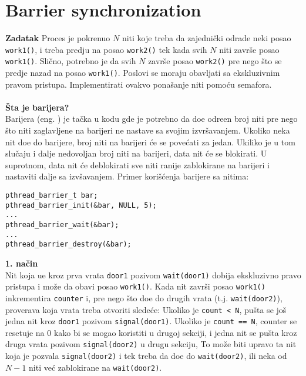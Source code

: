 \clearpage
\section{\latin Barrier synchronization}
\textbf{\large Zadatak} Proces je pokrenuo $N$ niti koje treba da zajedni\v{c}ki odrade neki posao \texttt{work1()}, i treba predju na posao \texttt{work2()} tek kada svih $N$ niti zavr\v{s}e posao \texttt{work1()}. Sli\v{c}no, potrebno je da svih $N$ zavr\v{s}e posao \texttt{work2()} pre nego \v{s}to se predje nazad na posao \texttt{work1()}. Poslovi se moraju obavljati sa ekskluzivnim pravom pristupa. Implementirati ovakvo pona\v{s}anje niti pomo\'{c}u semafora.
\\\\
\textbf{\v{S}ta je barijera?}
\\
Barijera (eng. ) je ta\v{c}ka u kodu gde je potrebno da do\dj{}e odre\dj{}en broj niti pre nego \v{s}to niti zaglavljene na barijeri ne nastave sa svojim izvr\v{s}avanjem. Ukoliko neka nit do\dj{}e do barijere, broj niti na barijeri \'{c}e se pove\'{c}ati za jedan. Ukiliko je u tom slu\v{c}aju i dalje nedovoljan broj niti na barijeri, data nit \'{c}e se blokirati. U suprotnom, data nit \'{c}e deblokirati sve niti ranije zablokirane na barijeri i nastaviti dalje sa izv\v{s}avanjem. Primer kori\v{s}\'{c}enja barijere sa  nitima:
\begin{lstlisting}
pthread_barrier_t bar;
pthread_barrier_init(&bar, NULL, 5);
...
pthread_barrier_wait(&bar);
...
pthread_barrier_destroy(&bar);
\end{lstlisting}
\textbf{\large 1. na\v{c}in}\\
Nit koja u\dj{}e kroz prva vrata \texttt{door1} pozivom \texttt{wait(door1)} dobija ekskluzivno pravo pristupa i mo\v{z}e da obavi posao \texttt{work1()}. Kada nit zavr\v{s}i posao \texttt{work1()} inkrementira \texttt{counter} i, pre nego \v{s}to do\dj{}e do drugih vrata (t.j. \texttt{wait(door2)}), proverava koja vrata treba otvoriti slede\'{c}e: Ukoliko je \texttt{count < N}, pu\v{s}ta se jo\v{s} jedna nit kroz \texttt{door1} pozivom \texttt{signal(door1)}. Ukoliko je \texttt{count == N}, counter se resetuje na 0 kako bi se mogao koristiti u drugoj sekciji, i jedna nit se pu\v{s}ta kroz druga vrata pozivom \texttt{signal(door2)} u drugu sekciju, To mo\v{z}e biti upravo ta nit koja je pozvala \texttt{signal(door2)} i tek treba da do\dj{}e do \texttt{wait(door2)}, ili neka od $N-1$ niti ve\'{c} zablokirane na \texttt{wait(door2)}.
